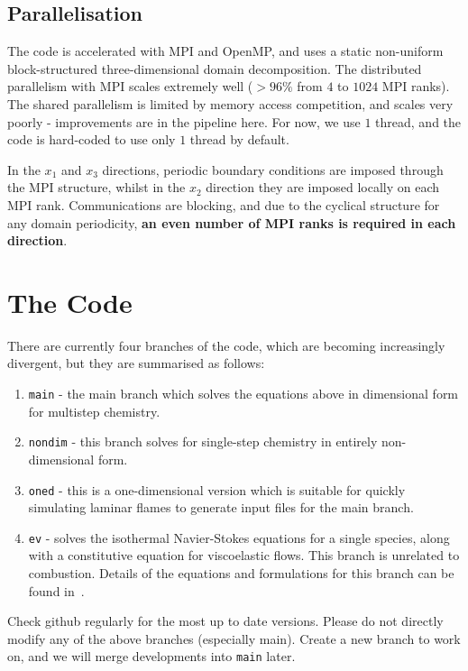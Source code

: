 \documentclass[notitlepage]{revtex4-1}
\begin{document}
\subsection{Parallelisation}

The code is accelerated with MPI and OpenMP, and uses a static non-uniform block-structured three-dimensional domain decomposition. The distributed parallelism with MPI scales extremely well ($>96\%$ from $4$ to $1024$ MPI ranks). The shared parallelism is limited by memory access competition, and scales very poorly - improvements are in the pipeline here. For now, we use $1$ thread, and the code is hard-coded to use only $1$ thread by default.

In the $x_{1}$ and $x_{3}$ directions, periodic boundary conditions are imposed through the MPI structure, whilst in the $x_{2}$ direction they are imposed locally on each MPI rank. Communications are blocking, and due to the cyclical structure for any domain periodicity, \textbf{an even number of MPI ranks is required in each direction}.


\section{The Code}

There are currently four branches of the code, which are becoming increasingly divergent, but they are summarised as follows:
\begin{enumerate}
\item \verb|main| - the main branch which solves the equations above in dimensional form for multistep chemistry.
\item \verb|nondim| - this branch solves for single-step chemistry in entirely non-dimensional form.
\item \verb|oned| - this is a one-dimensional version which is suitable for quickly simulating laminar flames to generate input files for the main branch.
\item \verb|ev| - solves the isothermal Navier-Stokes equations for a single species, along with a constitutive equation for viscoelastic flows. This branch is unrelated to combustion. Details of the equations and formulations for this branch can be found in~\cite{king_2023}.
\end{enumerate}

Check github regularly for the most up to date versions. Please do not directly modify any of the above branches (especially main). Create a new branch to work on, and we will merge developments into \verb|main| later.
\end{document}

